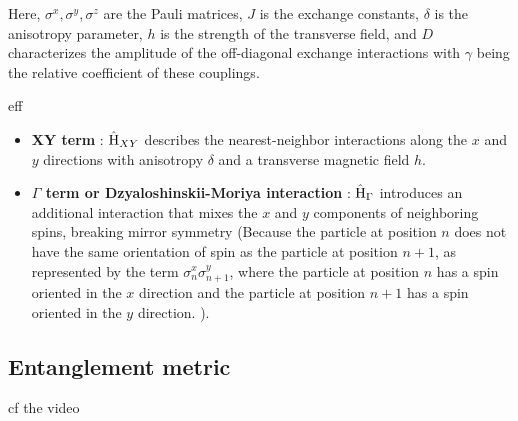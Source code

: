 Here, $\sigma^x, \sigma^y, \sigma^z$ are the Pauli matrices, $J$ is the exchange constants, 
$\delta$ is the anisotropy parameter, 
$h$ is the strength of the transverse field, and 
$D$ characterizes the amplitude of the off-diagonal exchange interactions with 
$\gamma$ being the relative coefficient of these couplings.

eff

\begin{itemize}
    \item \textbf{XY term} : $\operatorname{{\hat{H}}}_{XY}$ describes the nearest-neighbor interactions along the 
	$x$ and $y$ directions with anisotropy $\delta$ and a transverse magnetic field $h$.
	\item \textbf{$\Gamma$ term or Dzyaloshinskii-Moriya interaction} :
	 $\operatorname{{\hat{H}}}_{\Gamma}$ introduces an additional interaction 
	that mixes the $x$ and $y$ components of neighboring spins, breaking mirror symmetry (Because the particle at 
	position $n$ does not have the same orientation of spin as the particle at position $n+1$, 
	as represented by the term $\sigma^x_n \sigma^y_{n+1}$, where the particle at position $n$ has a spin oriented in the $x$ 
	direction and the particle at position $n+1$ has a spin oriented in the $y$ direction.
	).
\end{itemize}



\subsection{Entanglement metric} 

cf the video \url{}